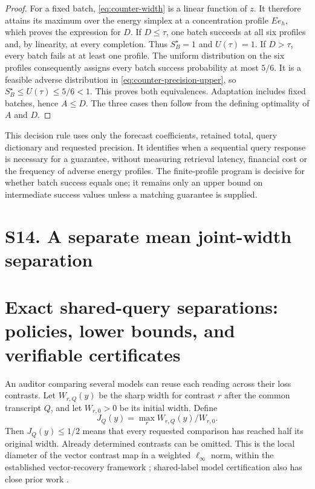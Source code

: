 \begin{proof}
For a fixed batch, \eqref{eq:counter-width} is a linear function of
$z$. It therefore attains its maximum over the energy simplex at a
concentration profile $Ee_h$, which proves the expression for $D$.
If $D\leq\tau$, one batch succeeds at all six profiles and, by
linearity, at every completion. Thus $S_B^\star=1$ and $U(\tau)=1$.
If $D>\tau$, every batch fails at at least one profile. The uniform
distribution on the six profiles consequently assigns every batch
success probability at most $5/6$. It is a feasible adverse distribution
in \eqref{eq:counter-precision-upper}, so
$S_B^\star\leq U(\tau)\leq5/6<1$. This proves both equivalences.
Adaptation includes fixed batches, hence $A\leq D$. The three cases
then follow from the defining optimality of $A$ and $D$.
\end{proof}

This decision rule uses only the forecast coefficients, retained total,
query dictionary and requested precision. It identifies when a sequential
query response is necessary for a guarantee, without measuring retrieval
latency, financial cost or the frequency of adverse energy profiles.
The finite-profile program is decisive for whether batch success equals
one; it remains only an upper bound on intermediate success values unless
a matching guarantee is supplied.
\section{S14. A separate mean joint-width separation}
\section{Exact shared-query separations: policies, lower bounds, and verifiable certificates}
\label{sec:joint-separations}
An auditor comparing several models can reuse each reading across their
loss contrasts. Let $W_{r,Q}(y)$ be the sharp width for contrast $r$ after
the common transcript $Q$, and let $W_{r,0}>0$ be its initial width. Define
\[
 J_Q(y)=\max_r W_{r,Q}(y)/W_{r,0}.
\]
Then $J_Q(y)\leq1/2$ means that every requested comparison has reached
half its original width. Already determined contrasts can be omitted.
This is the local diameter of the vector contrast map in a weighted
$\ell_\infty$ norm, within the established vector-recovery framework
\citep{krieg2025}; shared-label model certification also has close prior
work \citep{kuboyama2026}.


